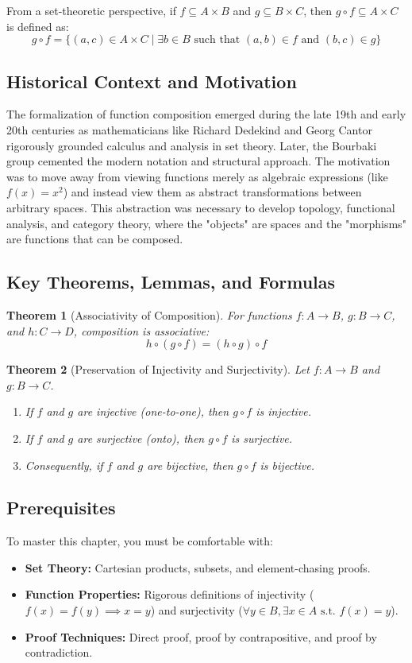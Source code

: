 \documentclass[11pt, a4paper]{article}
\newtheorem{theorem}{Theorem}[section]
\theoremstyle{definition}
\theoremstyle{remark}
\begin{document}
From a set-theoretic perspective, if $f \subseteq A \times B$ and $g \subseteq B \times C$, then $g \circ f \subseteq A \times C$ is defined as:
\[ g \circ f = \{ (a, c) \in A \times C \mid \exists b \in B \text{ such that } (a, b) \in f \text{ and } (b, c) \in g \} \]

\subsection{Historical Context and Motivation}
The formalization of function composition emerged during the late 19th and early 20th centuries as mathematicians like Richard Dedekind and Georg Cantor rigorously grounded calculus and analysis in set theory. Later, the Bourbaki group cemented the modern notation and structural approach. The motivation was to move away from viewing functions merely as algebraic expressions (like $f(x) = x^2$) and instead view them as abstract transformations between arbitrary spaces. This abstraction was necessary to develop topology, functional analysis, and category theory, where the "objects" are spaces and the "morphisms" are functions that can be composed.

\subsection{Key Theorems, Lemmas, and Formulas}
\begin{theorem}[Associativity of Composition]
For functions $f: A \to B$, $g: B \to C$, and $h: C \to D$, composition is associative:
\[ h \circ (g \circ f) = (h \circ g) \circ f \]
\end{theorem}

\begin{theorem}[Preservation of Injectivity and Surjectivity]
Let $f: A \to B$ and $g: B \to C$.
\begin{enumerate}
    \item If $f$ and $g$ are injective (one-to-one), then $g \circ f$ is injective.
    \item If $f$ and $g$ are surjective (onto), then $g \circ f$ is surjective.
    \item Consequently, if $f$ and $g$ are bijective, then $g \circ f$ is bijective.
\end{enumerate}
\end{theorem}

\subsection{Prerequisites}
To master this chapter, you must be comfortable with:
\begin{itemize}
    \item \textbf{Set Theory:} Cartesian products, subsets, and element-chasing proofs.
    \item \textbf{Function Properties:} Rigorous definitions of injectivity ($f(x)=f(y) \implies x=y$) and surjectivity ($\forall y \in B, \exists x \in A \text{ s.t. } f(x)=y$).
    \item \textbf{Proof Techniques:} Direct proof, proof by contrapositive, and proof by contradiction.
\end{itemize}
\end{document}
